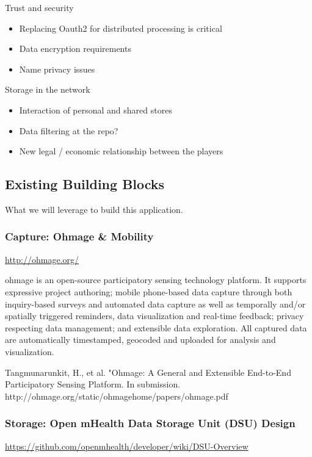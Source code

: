 Trust and security
\begin{itemize}
\item Replacing Oauth2 for distributed processing is critical
\item Data encryption requirements
\item Name privacy issues
\end{itemize}

Storage in the network
\begin{itemize}
\item Interaction of personal and shared stores
\item Data filtering at the repo?
\item New legal / economic relationship between the players
\end{itemize}

\subsection{Existing Building Blocks} 

What we will leverage to build this application.

\subsubsection{Capture: Ohmage \& Mobility}

\url{http://ohmage.org/}

ohmage is an open-source participatory sensing technology platform. It supports expressive project authoring; mobile phone-based data capture through both inquiry-based surveys and automated data capture as well as temporally and/or spatially triggered reminders, data visualization and real-time feedback; privacy respecting data management; and extensible data exploration. All captured data are automatically timestamped, geocoded and uploaded for analysis and visualization. 

Tangmunarunkit, H., et al. "Ohmage: A General and Extensible End-to-End Participatory Sensing Platform. In submission. http://ohmage.org/static/ohmagehome/papers/ohmage.pdf


\subsubsection{Storage: Open mHealth Data Storage Unit (DSU) Design}

\url{https://github.com/openmhealth/developer/wiki/DSU-Overview}

